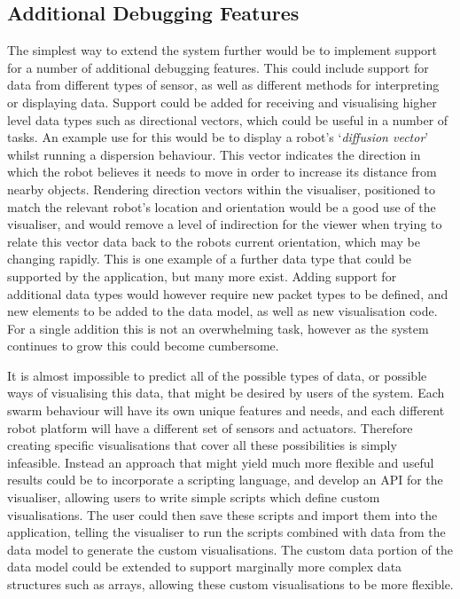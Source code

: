 
\subsection{Additional Debugging Features}

The simplest way to extend the system further would be to implement support for a number of additional debugging features. This could include support for data from different types of sensor, as well as different methods for interpreting or displaying data. Support could be added for receiving and visualising higher level data types such as directional vectors, which could be useful in a number of tasks. An example use for this would be to display a robot's `\textit{diffusion vector}' whilst running a dispersion behaviour. This vector indicates the direction in which the robot believes it needs to move in order to increase its distance from nearby objects. Rendering direction vectors within the visualiser, positioned to match the relevant robot's location and orientation would be a good use of the visualiser, and would remove a level of indirection for the viewer when trying to relate this vector data back to the robots current orientation, which may be changing rapidly. This is one example of a further data type that could be supported by the application, but many more exist. Adding support for additional data types would however require new packet types to be defined, and new elements to be added to the data model, as well as new visualisation code. For a single addition this is not an overwhelming task, however as the system continues to grow this could become cumbersome.

It is almost impossible to predict all of the possible types of data, or possible ways of visualising this data, that might be desired by users of the system. Each swarm behaviour will have its own unique features and needs, and each different robot platform will have a different set of sensors and actuators. Therefore creating specific visualisations that cover all these possibilities is simply infeasible. Instead an approach that might yield much more flexible and useful results could be to incorporate a scripting language, and develop an API for the visualiser, allowing users to write simple scripts which define custom visualisations. The user could then save these scripts and import them into the application, telling the visualiser to run the scripts combined with data from the data model to generate the custom visualisations. The custom data portion of the data model could be extended to support marginally more complex data structures such as arrays, allowing these custom visualisations to be more flexible.

